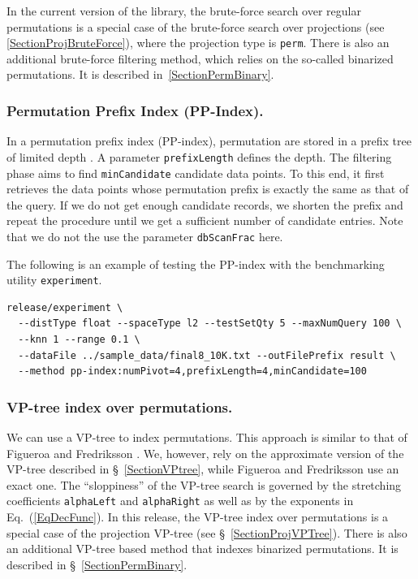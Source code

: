 \documentclass[runningheads,a4paper]{llncs}
\newcommand{\ttt}[1]{\texttt{#1}}
\begin{document}
{In the current version of the library, the brute-force search over
regular permutations is a special case of the brute-force search
over projections (see \ref{SectionProjBruteForce}), where the projection type is \ttt{perm}. 
There is also an additional brute-force filtering method, which relies on the so-called binarized permutations.
It is described in~\ref{SectionPermBinary}.

\subsubsection{Permutation Prefix Index  (PP-Index).}
In a permutation prefix index (PP-index),
 permutation are stored in a prefix tree 
of limited depth \cite{Esuli:2012}. A parameter \ttt{prefixLength}
defines the depth.
The filtering phase aims to find \ttt{minCandidate} candidate data points.
To this end, it first retrieves the data points whose permutation prefix is exactly the same
as that of the query. If we do not get enough candidate records, we shorten the prefix
and repeat the procedure until we get a sufficient number of candidate entries.
Note that we do not the use the parameter \ttt{dbScanFrac} here.

The following is an example of testing the PP-index with the benchmarking utility \ttt{experiment}.
{
\footnotesize
\begin{verbatim}
release/experiment \
  --distType float --spaceType l2 --testSetQty 5 --maxNumQuery 100 \
  --knn 1 --range 0.1 \
  --dataFile ../sample_data/final8_10K.txt --outFilePrefix result \
  --method pp-index:numPivot=4,prefixLength=4,minCandidate=100
\end{verbatim}
}

\subsubsection{VP-tree index over permutations.}
We can use a VP-tree to index permutations.
This approach is similar to that of Figueroa and Fredriksson \cite{figueroa2009speeding}. 
We, however, rely on the approximate version of the VP-tree described in \S~\ref{SectionVPtree},
while Figueroa and Fredriksson use an exact one.
The ``sloppiness'' of the VP-tree search is governed by the stretching coefficients 
 \ttt{alphaLeft}   and \ttt{alphaRight} as well as by the exponents in Eq.~(\ref{EqDecFunc}).
In this release, the VP-tree index over permutations is a special
case of the projection VP-tree (see \S~\ref{SectionProjVPTree}).
There is also an additional VP-tree based method that indexes binarized permutations.
It is described in \S~\ref{SectionPermBinary}.

}
\end{document}
